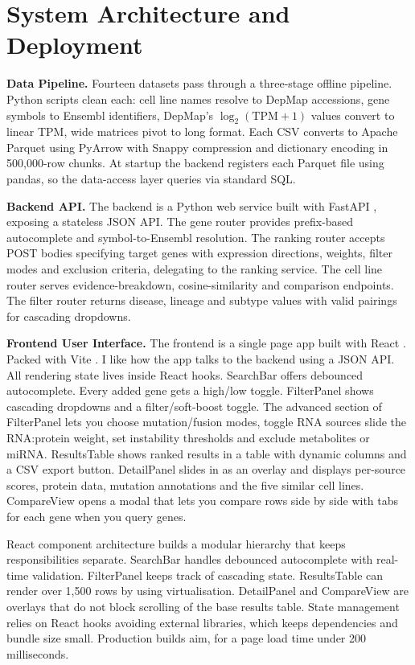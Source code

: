 \documentclass[author={Karen Coutinho, Ishaan Bhalla, Aman Raj, Dixit Kaloorani Malarmannan},
                supervisor={Dr. Daniel D'Andrea},
                degree={MSc},
                title={CellSelector Omics: A Multi-Omics Recommendation System for Cell Line Selection},
                subtitle={},
                type={},
                year={2026}]{dissertation}
\begin{document}
\section{System Architecture and Deployment}

{\bf Data Pipeline.} Fourteen datasets pass through a three-stage offline pipeline. Python scripts clean each: cell line names resolve to DepMap accessions, gene symbols to Ensembl identifiers, DepMap's $\log_2(\text{TPM}+1)$ values convert to linear TPM, wide matrices pivot to long format. Each CSV converts to Apache Parquet using PyArrow with Snappy compression and dictionary encoding in 500,000-row chunks. At startup the backend registers each Parquet file using pandas, so the data-access layer queries via standard SQL.



{\bf Backend API.} The backend is a Python web service built with FastAPI \cite{fastapi2021}, exposing a stateless JSON API. The gene router provides prefix-based autocomplete and symbol-to-Ensembl resolution. The ranking router accepts POST bodies specifying target genes with expression directions, weights, filter modes and exclusion criteria, delegating to the ranking service. The cell line router serves evidence-breakdown, cosine-similarity and comparison endpoints. The filter router returns disease, lineage and subtype values with valid pairings for cascading dropdowns.

{\bf Frontend User Interface.} The frontend is a single page app built with React \cite{react2024}. Packed with Vite \cite{vite2024}. I like how the app talks to the backend using a JSON API. All rendering state lives inside React hooks. SearchBar offers debounced autocomplete. Every added gene gets a high/low toggle. FilterPanel shows cascading dropdowns and a filter/soft-boost toggle. The advanced section of FilterPanel lets you choose mutation/fusion modes, toggle RNA sources slide the RNA:protein weight, set instability thresholds and exclude metabolites or miRNA. ResultsTable shows ranked results in a table with dynamic columns and a CSV export button. DetailPanel slides in as an overlay and displays per-source scores, protein data, mutation annotations and the five similar cell lines. CompareView opens a modal that lets you compare rows side by side with tabs for each gene when you query genes.

React component architecture builds a modular hierarchy that keeps responsibilities separate. SearchBar handles debounced autocomplete with real-time validation. FilterPanel keeps track of cascading state. ResultsTable can render over 1,500 rows by using virtualisation. DetailPanel and CompareView are overlays that do not block scrolling of the base results table. State management relies on React hooks avoiding external libraries, which keeps dependencies and bundle size small. Production builds aim, for a page load time under 200 milliseconds.
\end{document}
